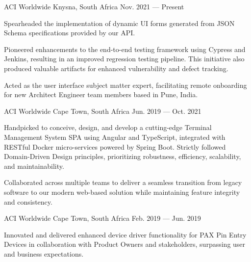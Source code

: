 
\begin{cventries}
  {ACI Worldwide}
  {Knysna, South Africa}
  {Nov. 2021 --- Present}
  {
    \begin{cvitems}
      \item {Spearheaded the implementation of dynamic UI forms generated from JSON Schema specifications provided by our API.}
      \item {
                  Pioneered enhancements to the end-to-end testing framework using Cypress and Jenkins, resulting in an improved
                  regression testing pipeline. This initiative also produced valuable artifacts for enhanced vulnerability and defect
                  tracking.
            }
      \item {
                  Acted as the user interface subject matter expert, facilitating remote onboarding for new Architect Engineer team members based in Pune,
                  India.
            }
    \end{cvitems}
  }

  {ACI Worldwide}
  {Cape Town, South Africa}
  {Jun. 2019 --- Oct. 2021}
  {
    \begin{cvitems}
      \item {Handpicked to conceive, design, and develop a cutting-edge
                  Terminal Management System SPA using Angular and TypeScript, integrated
                  with RESTful Docker micro-services powered by Spring Boot.}
            {Strictly followed Domain-Driven Design principles, prioritizing
                  robustness, efficiency, scalability, and maintainability.}
      \item {Collaborated across multiple teams to deliver a
                  seamless transition from legacy software to our modern web-based solution
                  while maintaining feature integrity and consistency.}
    \end{cvitems}
  }

  {ACI Worldwide}
  {Cape Town, South Africa}
  {Feb. 2019 --- Jun. 2019}
  {
    \begin{cvitems}
      \item {Innovated and delivered enhanced device driver
                  functionality for PAX Pin Entry Devices in collaboration with Product
                  Owners and stakeholders, surpassing user and business expectations.}
    \end{cvitems}
  }

\end{cventries}
